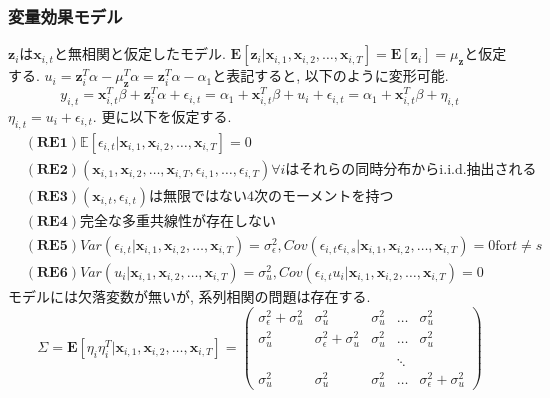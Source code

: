 \documentclass[paper=a4paper,fontsize=10pt]{jlreq}
\begin{document}
\subsubsection{変量効果モデル}
$\mathbf{z}_i$は$\mathbf{x}_{i,t}$と無相関と仮定したモデル. $\mathbf{E}[\mathbf{z}_{i}|\mathbf{x}_{i,1}, \mathbf{x}_{i,2}, \dots, \mathbf{x}_{i,T}] = \mathbf{E}[\mathbf{z}_{i}] = \mu_{\mathbf{z}}$と仮定する. ${u}_i = \mathbf{z}_{i}^T \alpha - \mu_{\mathbf{z}}^T \alpha = \mathbf{z}_{i}^T \alpha - \alpha_1$と表記すると, 以下のように変形可能. 
\begin{equation*}
  y_{i,t} = \mathbf{x}_{i,t}^T \beta + \mathbf{z}_{i}^T \alpha + \epsilon_{i,t} = \alpha_1 + \mathbf{x}_{i,t}^T \beta + {u}_i + \epsilon_{i,t} = \alpha_1 + \mathbf{x}_{i,t}^T \beta + \eta_{i,t}
\end{equation*}
$\eta_{i,t} = {u}_i + \epsilon_{i,t}$. 更に以下を仮定する.
\begin{align*}
  &\mathbf{(RE1)}　\mathbb{E}[\epsilon_{i,t}|\mathbf{x}_{i,1}, \mathbf{x}_{i,2}, \dots, \mathbf{x}_{i,T}]=0\\
  &\mathbf{(RE2)}　(\mathbf{x}_{i,1}, \mathbf{x}_{i,2}, \dots, \mathbf{x}_{i,T}, \epsilon_{i,1}, \dots, \epsilon_{i,T}) \forall i\text{はそれらの同時分布からi.i.d.抽出される}\\
  &\mathbf{(RE3)}　(\mathbf{x}_{i,t}, \epsilon_{i,t})\text{は無限ではない4次のモーメントを持つ}\\
  &\mathbf{(RE4)}　\text{完全な多重共線性が存在しない}\\
  &\mathbf{(RE5)}　Var(\epsilon_{i,t}|\mathbf{x}_{i,1}, \mathbf{x}_{i,2}, \dots, \mathbf{x}_{i,T}) = \sigma_\epsilon^2,　Cov(\epsilon_{i,t}\epsilon_{i,s}|\mathbf{x}_{i,1}, \mathbf{x}_{i,2}, \dots, \mathbf{x}_{i,T}) = 0　\text{for}　t \neq s\\
  &\mathbf{(RE6)}　{Var}({u}_{i}|\mathbf{x}_{i,1}, \mathbf{x}_{i,2}, \dots, \mathbf{x}_{i,T}) = \sigma_u^2,　Cov(\epsilon_{i,t}{u}_{i}|\mathbf{x}_{i,1}, \mathbf{x}_{i,2}, \dots, \mathbf{x}_{i,T}) = 0
\end{align*}
モデルには欠落変数が無いが, 系列相関の問題は存在する. 
\begin{equation*}
  \Sigma = \mathbf{E}[\eta_i\eta_i^T|\mathbf{x}_{i,1}, \mathbf{x}_{i,2}, \dots, \mathbf{x}_{i,T}]
  =
  \begin{pmatrix}
    \sigma_\epsilon^2 + \sigma_u^2 & \sigma_u^2 & \sigma_u^2 &\dots&\sigma_u^2\\
    \sigma_u^2 &\sigma_\epsilon^2 + \sigma_u^2 & \sigma_u^2 &\dots&\sigma_u^2\\
    \\
    &&&\ddots&\\
    \sigma_u^2&\sigma_u^2&\sigma_u^2&\dots&\sigma_\epsilon^2 + \sigma_u^2
  \end{pmatrix}
\end{equation*}
\end{document}
